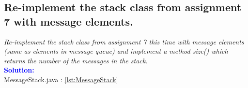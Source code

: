 \documentclass[main.tex]{subfiles}
\begin{document}
\subsection*{Re-implement the stack class from assignment 7 with message elements.}
\textit{Re-implement the stack class from assignment 7 this time with message elements (same as
elements in message queue) and implement a method size() which returns the number of the
messages in the stack.}\\
\indent \textbf{\textcolor{blue}{Solution:}} \\
MessageStack.java : \ref{lst:MessageStack} \\
\end{document}
